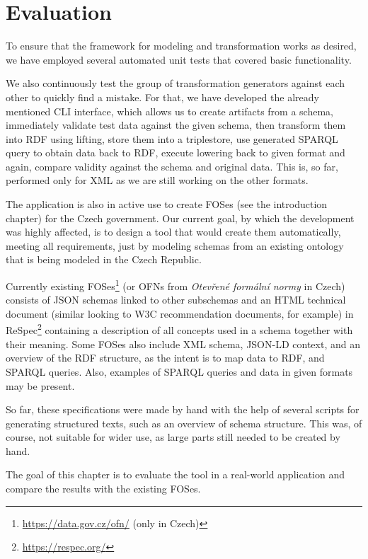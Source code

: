 \chapter{Evaluation}
\label{chapters:evaluation}

To ensure that the framework for modeling and transformation works as desired, we have employed several automated unit tests that covered basic functionality.

We also continuously test the group of transformation generators against each other to quickly find a mistake. For that, we have developed the already mentioned CLI interface, which allows us to create artifacts from a schema, immediately validate test data against the given schema, then transform them into RDF using lifting, store them into a triplestore, use generated SPARQL query to obtain data back to RDF, execute lowering back to given format and again, compare validity against the schema and original data. This is, so far, performed only for XML as we are still working on the other formats.

\medskip

The application is also in active use to create FOSes (see the introduction chapter) for the Czech government. Our current goal, by which the development was highly affected, is to design a tool that would create them automatically, meeting all requirements, just by modeling schemas from an existing ontology that is being modeled \cite{kvremen2019improving} in the Czech Republic.

Currently existing FOSes\footnote{\url{https://data.gov.cz/ofn/} (only in Czech)} (or OFNs from \textit{Otevřené formální normy} in Czech) consists of JSON schemas linked to other subschemas and an HTML technical document (similar looking to W3C recommendation documents, for example) in ReSpec\footnote{\url{https://respec.org/}} containing a description of all concepts used in a schema together with their meaning. Some FOSes also include XML schema, JSON-LD context, and an overview of the RDF structure, as the intent is to map data to RDF, and SPARQL queries. Also, examples of SPARQL queries and data in given formats may be present.

So far, these specifications were made by hand with the help of several scripts for generating structured texts, such as an overview of schema structure. This was, of course, not suitable for wider use, as large parts still needed to be created by hand.

The goal of this chapter is to evaluate the tool in a real-world application and compare the results with the existing FOSes.

